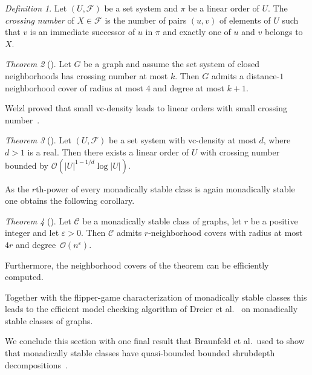 \documentclass[1p,number,a4paper]{elsarticle}
\theoremstyle{remark}
\newcommand{\Oof}{\mathcal{O}}
\newcommand{\Cc}{\mathscr{C}}
\newcommand{\Ff}{\mathcal{F}}
\renewcommand{\epsilon}{\varepsilon}
\newtheorem{theorem}{Theorem}[section]
\newtheorem{definition}[theorem]{Definition}
\begin{document}
\begin{definition}
    Let $(U,\Ff)$ be a set system and $\pi$ be a linear order of $U$. 
    The \emph{crossing number} of $X\in \Ff$ is the  number of pairs $(u,v)$ of elements of $U$ such that $v$ is an immediate successor of $u$ in $\pi$ and exactly one of $u$ and $v$ belongs to $X$. 
\end{definition}


\begin{theorem}[\cite{dreier2023first}]
     Let $G$ be a graph and assume the set system of closed neighborhoods has crossing number at most $k$. Then $G$ admits a distance-$1$ neighborhood cover of radius at most $4$ and degree at most $k+1$. 
\end{theorem}

Welzl proved that small vc-density leads to linear orders with small crossing number~\cite{welzl1988partition}. 

\begin{theorem}[\cite{welzl1988partition}]
     Let $(U,\Ff)$ be a set system with vc-density at most $d$, where \mbox{$d>1$} is a real. 
     Then there exists a linear order of $U$ with crossing number bounded by $\Oof(|U|^{1-1/d}\log |U|)$. 
\end{theorem}

As the $r$th-power of every monadically stable class is again monadically stable one obtains the following corollary. 

\begin{theorem}[\cite{dreier2023first}]
    Let $\Cc$ be a monadically stable class of graphs, let $r$ be a positive integer and let $\epsilon>0$. Then $\Cc$ admits \mbox{$r$-neighborhood} covers with radius at most $4r$ and degree~$\Oof(n^\epsilon)$. 
\end{theorem}

Furthermore, the neighborhood covers of the theorem can be efficiently computed. 

Together with the flipper-game characterization of monadically stable classes this leads to the efficient model checking algorithm of Dreier et al.~\cite{dreier2023first,dreier2023firstb} on monadically stable classes of graphs. 

We conclude this section with one final result that Braunfeld et al.\ used to show that monadically stable classes have quasi-bounded bounded shrubdepth decompositions~\cite{braunfeld2024decomposition}. 
\end{document}
